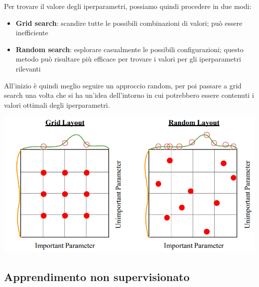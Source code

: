 \documentclass[12pt]{article}
\begin{document}
Per trovare il valore degli iperparametri, possiamo quindi procedere in due modi: 
\begin{itemize}
    \item \textbf{Grid search}: scandire tutte le possibili combinazioni di valori; può essere inefficiente
    \item \textbf{Random search}: esplorare casualmente le possibili configurazioni; questo metodo può risultare più efficace per trovare i valori per gli iperparametri rilevanti
\end{itemize}
All'inizio è quindi meglio seguire un approccio random, per poi passare a grid search una volta che si ha un'idea dell'intorno in cui potrebbero essere contenuti i valori ottimali degli iperparametri.
\begin{center}
    \includegraphics[width =1\linewidth]{Images/181.PNG}
\end{center}
\subsection{Apprendimento non supervisionato}
\end{document}
